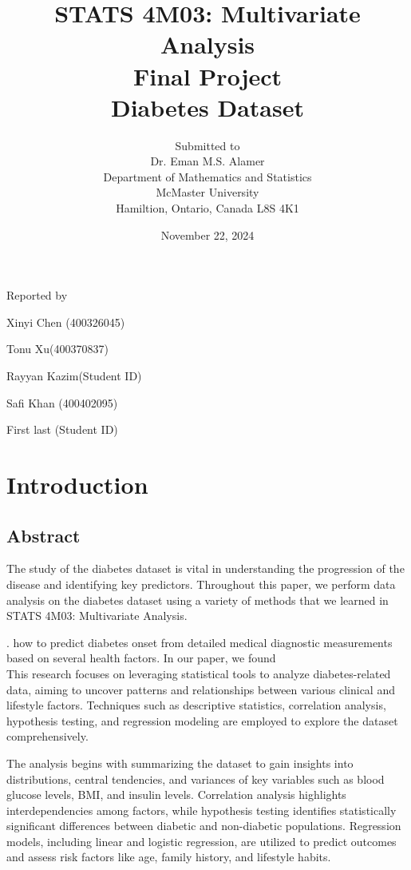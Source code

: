 \documentclass[12pt]{article}
\begin{document}
\title{STATS 4M03: Multivariate Analysis\\ Final Project \\ Diabetes Dataset }

\author{Submitted to\\ Dr. Eman M.S. Alamer 
\\Department of Mathematics and Statistics
\\McMaster University\\Hamiltion, Ontario, Canada L8S 4K1}
\date {November 22, 2024}


\maketitle

 \centerline{Reported by}
 \centerline{Xinyi Chen (400326045)}
  \centerline{Tonu Xu(400370837)}
   \centerline{Rayyan Kazim(Student ID)}
    \centerline{Safi Khan (400402095)}
     \centerline{First last (Student ID)}


\newpage
\section{Introduction}
\subsection{Abstract}

The study of the diabetes dataset is vital in understanding the progression of the disease and identifying key predictors. Throughout this paper, we perform data analysis on the diabetes dataset using a variety of methods that we learned in STATS 4M03: Multivariate Analysis. 

. how to predict diabetes onset from detailed medical diagnostic measurements based on several health factors. In our paper, we found\\


 This research focuses on leveraging statistical tools to analyze diabetes-related data, aiming to uncover patterns and relationships between various clinical and lifestyle factors. Techniques such as descriptive statistics, correlation analysis, hypothesis testing, and regression modeling are employed to explore the dataset comprehensively.

The analysis begins with summarizing the dataset to gain insights into distributions, central tendencies, and variances of key variables such as blood glucose levels, BMI, and insulin levels. Correlation analysis highlights interdependencies among factors, while hypothesis testing identifies statistically significant differences between diabetic and non-diabetic populations. Regression models, including linear and logistic regression, are utilized to predict outcomes and assess risk factors like age, family history, and lifestyle habits.
\end{document}
